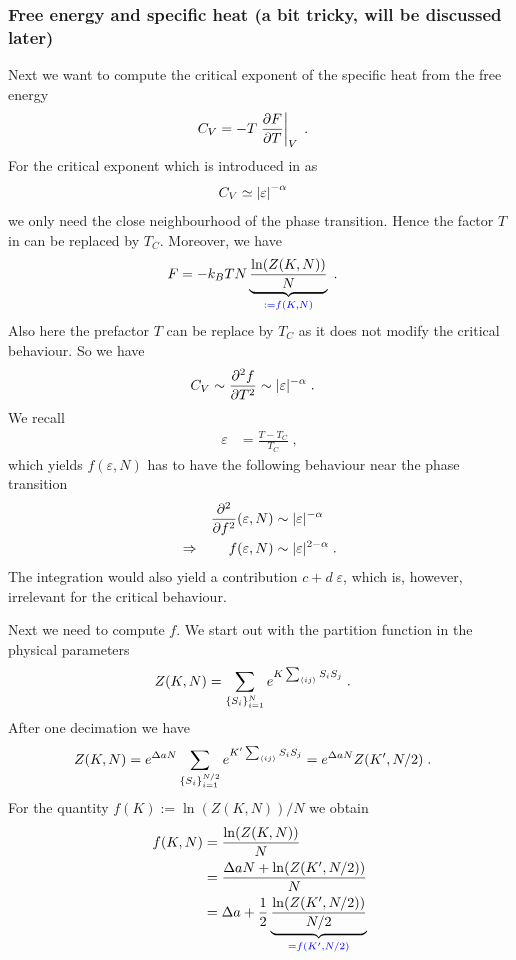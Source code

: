 \subsubsection{Free energy and specific heat (a bit tricky, will be discussed later)}



Next we want to compute the critical exponent of the specific heat from the free energy 
%
\begin{align}\label{eq:CV:a}
C_{V} &= -T \eval{\pdv{F}{T}}_{V}\;.
\end{align}
%
For the critical exponent which is introduced in   as
%
\begin{align*}
C_{V}&\simeq  \abs{\varepsilon}^{-\alpha}
\end{align*}
%
we only need the close neighbourhood of the phase transition.
Hence the factor $T$ in  can be replaced by $T_{C}$.
Moreover, we have
%
\begin{align*}
F &= - k_{B} T N \underbrace{
\frac{\ln(Z(K,N))}{N}
}_{\color{blue} := f(K,N)}\;.
\end{align*}
%
Also here the prefactor $T$ can be replace by $T_{C}$ as it does not modify the critical behaviour. So we have
%
\begin{align*}
C_{V} &\sim \pdv[2]{f}{T} \sim |\varepsilon|^{-\alpha}\;.
\end{align*}
%
We recall
%
\begin{align*}
\varepsilon &= \frac{T-T_{C}}{T_{C}}\;,
\end{align*}
%
which yields $f(\varepsilon,N)$ has to have the following behaviour near the phase transition
\begin{align}
\pdv[2]f(\varepsilon,N) &\sim |\varepsilon|^{-\alpha}\nonumber\\
\Rightarrow\qquad f(\varepsilon,N) &\sim |\varepsilon|^{2 -\alpha}\;.
\label{eq:f:epsilon}
\end{align}
%
The integration would also yield a contribution $c + d \;\varepsilon$, which is, however, irrelevant for the critical behaviour.


Next we need to compute $f$.
We start out with the partition function  in the physical parameters 
%
\begin{align*}
Z(K,N) &= \sum_{\{S_{i}\}_{i=1}^{N}} e^{K \sum_{\left\langle ij\right\rangle} S_{i}S_{j}}\;.
\end{align*}
%
After one decimation we have 
%
\begin{align*}
Z(K,N) &= e^{\Delta a N } \sum_{\{S_{i}\}_{i=1}^{N/2}} e^{K' \sum_{\left\langle ij\right\rangle} S_{i}S_{j}}
= e^{\Delta a N } Z(K',N/2)\;.
\end{align*}
%
For the quantity $f(K) := \ln(Z(K,N))/N$ we obtain
%
\begin{align*}
f(K,N) &= \frac{\ln(Z(K,N))}{N} \\
&=\frac{\Delta a N + \ln(Z(K',N/2))}{N}\\
&=\Delta a +  \frac{1}{2} \underbrace{
\frac{\ln(Z(K',N/2))}{N/2}
}_{\color{blue} = f(K',N/2)}
\end{align*}




